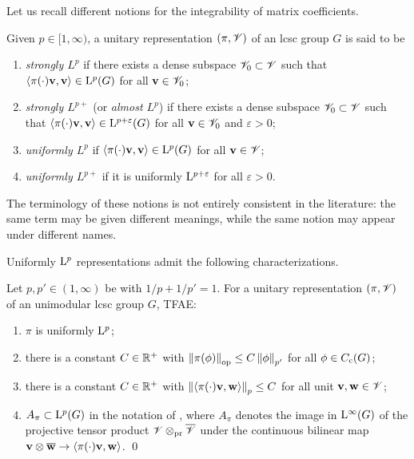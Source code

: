 \documentclass[a4paper, 10pt]{article}
\begin{document}
    Let us recall different notions for the integrability of matrix coefficients.
    \begin{definition}
        Given $p\in [1,\infty)$, a unitary representation $(\pi, \mathscr{V})$ of an lcsc group $G$ is said to be
        \begin{enumerate}
            \item \emph{strongly $L^p$} if there exists a dense subspace $\mathscr{V}_0\subset \mathscr{V}$ such that $\left\langle\pi(\cdot)\mathbf{v},\mathbf{v} \right\rangle\in \mathrm{L}^p(G)$ for all $\mathbf{v}\in\mathscr{V}_0$;
            \item \emph{strongly $L^{p+}$} (or \emph{almost $L^{p}$}) if there exists a dense subspace $\mathscr{V}_0\subset\mathscr{V}$ such that $\left\langle\pi(\cdot)\mathbf{v},\mathbf{v} \right\rangle\in \mathrm{L}^{p+\varepsilon}(G)$ for all $\mathbf{v}\in\mathscr{V}_0$ and $\varepsilon>0$;
            \item \emph{uniformly $L^p$} if $\left\langle\pi(\cdot)\mathbf{v},\mathbf{v} \right\rangle\in\mathrm{L}^p(G)$ for all $\mathbf{v}\in\mathscr{V}$;
            \item \emph{uniformly $L^{p+}$} if it is uniformly $\mathrm{L}^{p+\varepsilon}$ for all $\varepsilon>0$.
        \end{enumerate}
    \end{definition}
    \begin{remark*}
        The terminology of these notions is not entirely consistent in the literature: the same term may be given different meanings, while the same notion may appear under different names.
    \end{remark*}

    Uniformly $\mathrm{L}^p$ representations admit the following characterizations.
    \begin{lemma}\label{lem kunze-stein: uniformly Lp iff op norm bounded by Lp' norm}
        Let $p, p'\in(1,\infty)$ be with $1/p+1/p'=1$. For a unitary representation $(\pi,\mathscr{V})$ of an unimodular lcsc group $G$, TFAE:
        \begin{enumerate}
            \item $\pi$ is uniformly $\mathrm{L}^p$;
            \item there is a constant $C\in \mathbb{R}^+$ with $\left\| \pi(\phi) \right\|_{\mathrm{op}} \leq C \left\| \phi \right\|_{p'}$ for all $\phi\in C_{\mathrm{c}}(G)$;
            \item there is a constant $C\in\mathbb{R}^+$ with $\left\| \left\langle\pi(\cdot)\mathbf{v}, \mathbf{w} \right\rangle \right\|_{p}\leq C$ for all unit $\mathbf{v},\mathbf{w}\in\mathscr{V}$;
            \item $A_\pi\subset \mathrm{L}^p(G)$ in the notation of \cite{cowling1978the-kunze-stein,samei-wiersma2024exotic}, where $A_{\pi}$ denotes the image in $\mathrm{L}^{\infty}(G)$ of the projective tensor product $\mathscr{V}\otimes_{\mathrm{pr}}\overline{\mathscr{V}}$ under the continuous bilinear map $\mathbf{v}\otimes \overline{\mathbf{w}}\to\left\langle\pi(\cdot)\mathbf{v},\mathbf{w} \right\rangle$. \qed
        \end{enumerate}
    \end{lemma}
\end{document}
